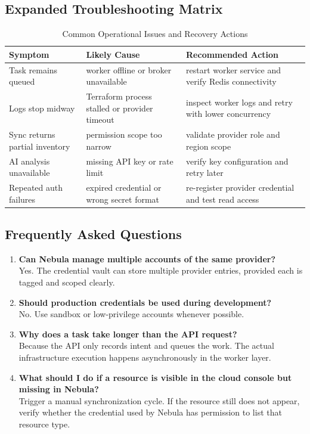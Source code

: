 \subsection{Expanded Troubleshooting Matrix}
\begin{table}[H]
\centering
\caption{Common Operational Issues and Recovery Actions}
\label{tab:appendix_troubleshooting}
\begin{tabular}{|p{3.6cm}|p{3.6cm}|p{4.4cm}|}
\hline
\textbf{Symptom} & \textbf{Likely Cause} & \textbf{Recommended Action} \\ \hline
Task remains queued & worker offline or broker unavailable & restart worker service and verify Redis connectivity \\ \hline
Logs stop midway & Terraform process stalled or provider timeout & inspect worker logs and retry with lower concurrency \\ \hline
Sync returns partial inventory & permission scope too narrow & validate provider role and region scope \\ \hline
AI analysis unavailable & missing API key or rate limit & verify key configuration and retry later \\ \hline
Repeated auth failures & expired credential or wrong secret format & re-register provider credential and test read access \\ \hline
\end{tabular}
\end{table}

\subsection{Frequently Asked Questions}
\begin{enumerate}
    \item \textbf{Can Nebula manage multiple accounts of the same provider?} \\
    Yes. The credential vault can store multiple provider entries, provided each is tagged and scoped clearly.
    \item \textbf{Should production credentials be used during development?} \\
    No. Use sandbox or low-privilege accounts whenever possible.
    \item \textbf{Why does a task take longer than the API request?} \\
    Because the API only records intent and queues the work. The actual \\ infrastructure execution happens asynchronously in the worker layer.
    \item \textbf{What should I do if a resource is visible in the cloud console but missing in Nebula?} \\
    Trigger a manual synchronization cycle. If the resource still does not appear, verify whether the credential used by Nebula has permission to list that resource type.
\end{enumerate}

\newpage
